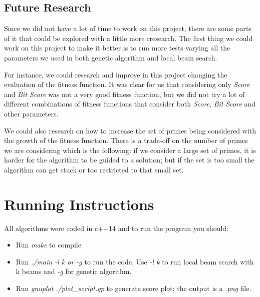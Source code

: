 \documentclass[12pt]{article}
\begin{document}
\subsection{Future Research}
Since we did not have a lot of time to work on this project, there are some parts of it that could be explored with a little more rresearch. The first thing we could work on this project to make it better is to run more tests varying all the parameters we used in both genetic algorithm and local beam search. 

For instance, we could research and improve in this project changing the evaluation of the fitness function. It was clear for us that considering only \emph{Score} and \emph{Bit Score} was not a very good fitness function, but we did not try a lot of different combinations of fitness functions that consider both \emph{Score}, \emph{Bit Score} and other parameters.

We could also research on how to increase the set of primes being considered with the growth of the fitness function. There is a trade-off on the number of primes we are considering which is the following: if we consider a large set of primes, it is harder for the algorithm to be guided to a solution; but if the set is too small the algorithm can get stuck or too restricted to that small set.

\section{Running Instructions}
All algorithms were coded in c++14 and to run the program you should:
\begin{itemize}
    \item{Run \emph{make} to compile}
    \item{Run \emph{./main -l k or -g} to run the code. Use \emph{-l k} to run local beam search with k beams and \emph{-g} for genetic algorithm.}
    \item{Run \emph{gnuplot ./plot\_script.gp} to generate score plot; the output is a \emph{.png} file.}
\end{itemize}
\end{document}
